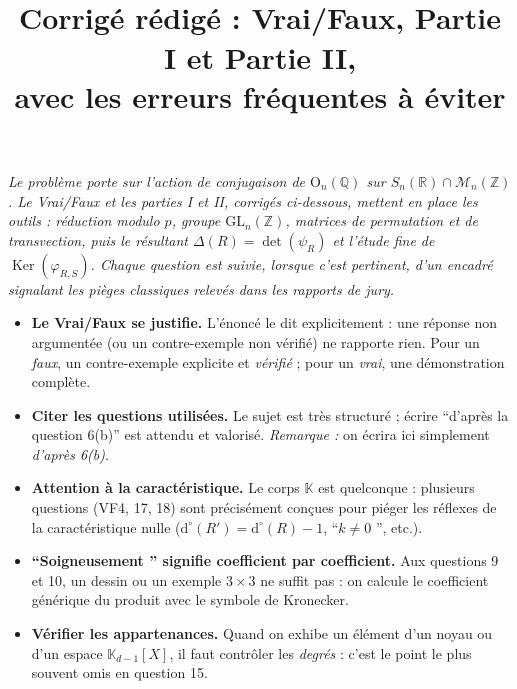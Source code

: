 \documentclass[11pt,a4paper]{article}
\title{\vspace{-1.2cm}{\color{bleuP}\bfseries\LARGE
Agrégation interne de mathématiques --- Session 2026\\[4pt]
\Large Première épreuve écrite (EAI MAT 1)}\\[8pt]
{\large Corrigé rédigé : Vrai/Faux, Partie I et Partie II,\\
avec les erreurs fréquentes à éviter}}
\author{}
\date{}
\newcommand{\og}{``}
\newcommand{\fg}{''}
\newcommand{\K}{\mathbb{K}}
\newcommand{\Z}{\mathbb{Z}}
\newcommand{\Q}{\mathbb{Q}}
\newcommand{\R}{\mathbb{R}}
\newcommand{\Mn}[1][n]{\mathcal{M}_{#1}}
\newcommand{\GLn}[1][n]{\mathrm{GL}_{#1}}
\newcommand{\On}[1][n]{\mathrm{O}_{#1}}
\newcommand{\Sym}[1][n]{S_{#1}}          %
\newcommand{\dg}[1]{\mathrm{d}^{\circ}\!\left(#1\right)}
\DeclareMathOperator{\Ker}{Ker}
\begin{document}
\maketitle
\vspace{-1.4cm}

\begin{center}
\begin{minipage}{0.92\textwidth}\small\itshape\color{grisP}
Le problème porte sur l'action de conjugaison de $\On(\Q)$ sur
$\Sym(\R)\cap\Mn(\Z)$. Le Vrai/Faux et les parties I et II, corrigés
ci-dessous, mettent en place les outils : réduction modulo $p$,
groupe $\GLn(\Z)$, matrices de permutation et de transvection,
puis le résultant $\Delta(R)=\det(\psi_R)$ et l'étude fine de
$\Ker(\varphi_{R,S})$. Chaque question est suivie, lorsque c'est
pertinent, d'un encadré signalant les pièges classiques relevés
dans les rapports de jury.
\end{minipage}
\end{center}

\begin{conseil}
\begin{itemize}[leftmargin=1.4em, itemsep=2pt]
\item \textbf{Le Vrai/Faux se justifie.} L'énoncé le dit explicitement :
une réponse non argumentée (ou un contre-exemple non vérifié) ne
rapporte rien. Pour un \emph{faux}, un contre-exemple explicite et
\emph{vérifié} ; pour un \emph{vrai}, une démonstration complète.
\item \textbf{Citer les questions utilisées.} Le sujet est très
structuré ; écrire \og d'après la question 6(b)\fg{} est attendu et
valorisé. \emph{Remarque :} on écrira ici simplement
\emph{d'après 6(b)}.
\item \textbf{Attention à la caractéristique.} Le corps $\K$ est
quelconque : plusieurs questions (VF4, 17, 18) sont précisément
conçues pour piéger les réflexes de la caractéristique nulle
($\dg{R'}=\dg{R}-1$, \og $k\neq 0$ \fg, etc.).
\item \textbf{\og Soigneusement \fg{} signifie coefficient par
coefficient.} Aux questions 9 et 10, un dessin ou un exemple
$3\times 3$ ne suffit pas : on calcule le coefficient générique du
produit avec le symbole de Kronecker.
\item \textbf{Vérifier les appartenances.} Quand on exhibe un élément
d'un noyau ou d'un espace $\K_{d-1}[X]$, il faut contrôler les
\emph{degrés} : c'est le point le plus souvent omis en question 15.
\end{itemize}
\end{conseil}
\end{document}
